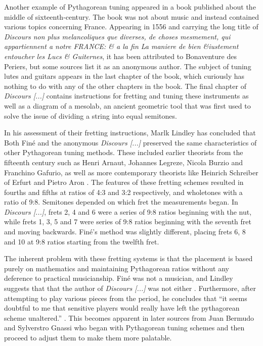Another example of Pythagorean tuning appeared in a book published about the middle of
sixteenth-century.  The book was not about music and instead contained various topics
concerning France.  Appearing in 1556 and carrying the long title of \textit{Discours non
plus melancoliques que diverses, de choses mesmement, qui appartiennent a notre FRANCE: \&
a la fin La maniere de bien \&iustement entoucher les Lucs \& Guiternes}, it has been
attributed to Bonaventure des Periers, but some sources list it as an anonymous author.
The subject of tuning lutes and guitars appears in the last chapter of the book, which
curiously has nothing to do with any of the other chapters in the book. The final chapter
of \textit{Discours [...]} contains instructions for fretting and tuning these instruments
as well as a diagram of a mesolab, an ancient geometric tool that was first used to solve
the issue of dividing a string into equal semitones.

In his assessment of their fretting instructions, Marlk Lindley has concluded that Both
Fin\'{e} and the anonymous \textit{Discours [...]}  preserved the same characteristics of
other Pythagorean tuning methods.  These included earlier theorists from the fifteenth
century such as Henri Arnaut, Johannes Legreze, Nicola Burzio and Franchino Gafurio, as
well as more contemporary theorists like Heinrich Schreiber of Erfurt and Pietro Aron
\autocite[11]{ML:1}. The features of these fretting schemes resulted in fourths and fifths
at ratios of 4:3 and 3:2 respectively, and wholetones with a ratio of 9:8.  Semitones
depended on which fret the measurements began.  In \textit{Discours [...]}, frets 2, 4 and
6 were a series of 9:8 ratios beginning with the nut, while frets 1, 3, 5 and 7 were
series of 9:8 ratios beginning with the seventh fret and moving backwards.  Fin\'{e}'s
method was slightly different, placing frets 6, 8 and 10 at 9:8 ratios starting from the
twelfth fret.

The inherent problem with these fretting systems is that the placement is based purely on
mathematics and maintaining Pythagorean ratios without any deference to practical
musicianship. Fin\'{e} was not a musician, and Lindley suggests that that the author of
\textit{Discours [...]} was not either \autocite[11]{ML:1}.  Furthermore, after attempting
to play various pieces from the period, he concludes that ``it seems doubtful to me that
sensitive players would really have left the pythagorean scheme unaltered.''
\autocite[13]{ML:1}.  This becomes apparent in later sources from Juan Bermudo and
Sylverstro Gnassi who began with Pythagorean tuning schemes and then proceed to adjust
them to make them more palatable.

